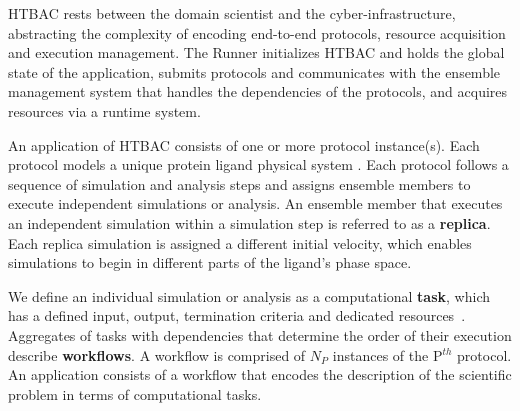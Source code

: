 HTBAC rests between the domain scientist and the cyber-infrastructure,
abstracting the complexity of encoding end-to-end protocols, resource
acquisition and execution management. The Runner initializes HTBAC and holds
the global state of the application, submits protocols and communicates with
the ensemble management system that handles the dependencies of the
protocols, and acquires resources via a runtime system.

 

An application of HTBAC consists of one or more protocol
instance(s). Each protocol models a unique protein ligand physical system
.
Each protocol follows a sequence of simulation and analysis steps and assigns
ensemble members to execute independent simulations or analysis. An ensemble
member that executes an independent simulation within a simulation step is
referred to as a \textbf{replica}. Each replica simulation is assigned a
different initial velocity, which enables simulations to begin in different
parts of the ligand's phase space.

We define an individual simulation or analysis as a computational
\textbf{task}, which has a defined input, output, termination criteria and
dedicated resources~\cite{power-of-many17}. Aggregates of tasks with
dependencies that determine the order of their execution describe
\textbf{workflows}. A workflow is comprised of $N_P$ instances of the
P$^{th}$ protocol. An application consists of a workflow that encodes the 
description of the scientific problem in terms of computational tasks. 





